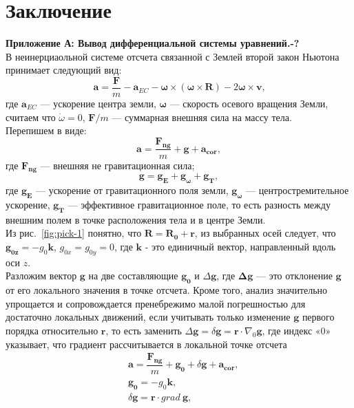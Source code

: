 \documentclass[hoptionsi, twocolumn]{revtex4-2}
\begin{document}
\twocolumngrid
\section{Заключение}
 
\newpage
\onecolumngrid
\textbf{Приложение А: Вывод дифференциальной системы уравнений.\cite{4}-?}\\
В неинерциаольной системе отсчета связанной с Землей второй закон Ньютона принимает следующий вид:
\begin{equation}
\bm{a}=\dfrac{\bm{F}}{m}-\bm{a}_{EC}-\bm{\omega} \times(\bm{\omega}\times \bm{R}) -2\bm{\omega} \times \bm{v}\text{,}\label{eq:1}
\end{equation}
где $\bm{a}_{EC}$  --- ускорение центра земли, $\bm{\omega}$  --- скорость осевого вращения Земли, считаем что ${\dot\omega}=0$, $\boldsymbol{F}/m$ --- суммарная внешняя сила на массу тела.\\
Перепишем в виде:
\begin{equation}
\bm{a}=\dfrac{\bm{F_{ng}}}{m}+\bm{g}+\bm{a_{cor}},\label{eq:2}
\end{equation}
где $\bm{F_{ng}}$ --- внешняя не гравитационная сила;
\begin{equation*}
    \bm g=\bm{g_E}+\bm{g_{\omega}}+\bm{g_T},
\end{equation*}
 где $\bm{g_E}$ --- ускорение от гравитационного поля земли, $\bm{g_{\omega}}$ ---  центростремительное ускорение, $\bm{g_T}$
--- эффективное гравитационное поле, то есть разность между внешним полем в точке расположения тела и в центре Земли.\\
Из рис.~\ref{fig:pick-1} понятно, что $\bm{R}=\bm{R_0}+\bm{r}$, из выбранных осей следует, что $\bm{g_{0z}}=-g_0\bm{k}$, $g_{0x}=g_{0y}=0$, где $\bm{k}$ - это единичный вектор, направленный вдоль оси $z$.\\
Разложим вектор $\bm{g}$ на две составляющие $\bm{g_0}$ и $\Delta\bm{g}$, где $\bm{\Delta\bm{g}}$ --- это отклонение $\bm{g}$ от его локального значения в точке отсчета. Кроме того, анализ значительно упрощается и сопровождается пренебрежимо малой погрешностью для достаточно локальных движений, если учитывать только изменение $\bm{g}$ первого порядка относительно $\bm{r}$, то есть заменить $\Delta \bm g=\delta \bm g=\bm r \cdot \nabla_0 \bm g$, где индекс «0» указывает, что градиент рассчитывается в локальной точке отсчета
\begin{align}
&\bm a = \dfrac{\bm{F_{ng}}}{m}+\bm{g_0}+\delta\bm g+\bm{a_{cor}}\text{,} \label{eq:3}\\
&\bm{g_0}=-g_0\bm k \text{,} \label{eq:4}\\
&\delta\bm g=\bm r\cdot grad \ \bm g\text{,}\label{eq:5}
\end{align}
\end{document}

